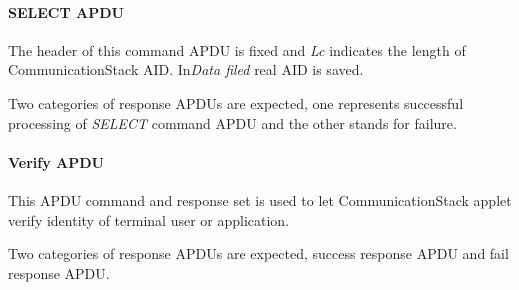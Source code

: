 \documentclass[]{llncs}
\begin{document}
\paragraph{SELECT APDU}
The header of this command APDU is fixed and \emph{Lc} indicates the length of CommunicationStack AID. In\emph{Data filed} real AID is saved.
\begin{table}[h]
\caption{SELECT command APDU}
\label{select-apdu}
\end{table}
Two categories of response APDUs are expected, one represents successful processing of \emph{SELECT} command APDU and the other stands for failure.
\begin{table}[h]
\caption{SELECT response APDU}
\label{select-response-apdu}
\end{table}

\paragraph{Verify APDU}
This APDU command and response set is used to let CommunicationStack applet verify identity of terminal user or application.

\begin{table}[h]
\caption{Verify command APDU}
\label{verify-command-apdu}
\end{table}
Two categories of response APDUs are expected, success response APDU and fail response APDU.
\end{document}
